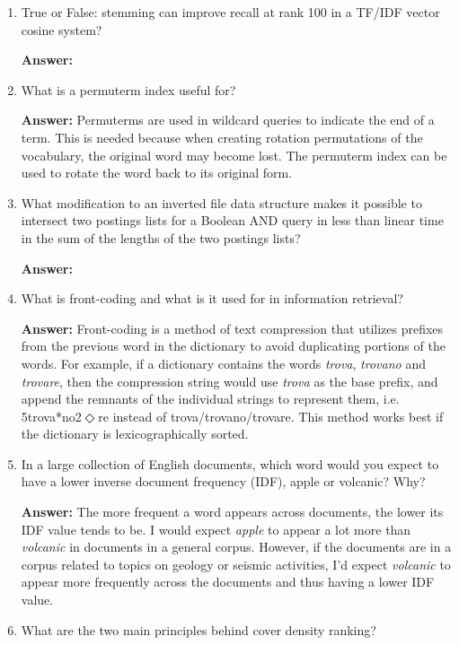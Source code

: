 \documentclass[11pt]{article}
\begin{document}
\begin{enumerate}
\begin{enumerate}
          \item True or False: stemming can improve recall at rank 100 in a TF/IDF vector cosine system?

                \textbf{Answer:}

          \item What is a permuterm index useful for?

                \textbf{Answer:} Permuterms are used in wildcard queries to indicate the end of a term. This is needed because when creating rotation permutations of the vocabulary, the original word may become lost. The permuterm index can be used to rotate the word back to its original form.

          \item What modification to an inverted file data structure makes it possible to intersect two postings lists for a Boolean AND query in less than linear time in the sum of the lengths of the two postings lists?

                \textbf{Answer:}

          \item What is front-coding and what is it used for in information retrieval?

                \textbf{Answer:} Front-coding is a method of text compression that utilizes prefixes from the previous word in the dictionary to avoid duplicating portions of the words. For example, if a dictionary contains the words \textit{trova}, \textit{trovano} and \textit{trovare}, then the compression string would use \textit{trova} as the base prefix, and append the remnants of the individual strings to represent them, i.e. 5trova*no2$\Diamond$re instead of trova/trovano/trovare. This method works best if the dictionary is lexicographically sorted.

          \item In a large collection of English documents, which word would you expect to have a lower inverse document frequency (IDF), apple or volcanic? Why?

                \textbf{Answer:} The more frequent a word appears across documents, the lower its IDF value tends to be. I would expect \textit{apple} to appear a lot more than \textit{volcanic} in documents in a general corpus. However, if the documents are in a corpus related to topics on geology or seismic activities, I'd expect \textit{volcanic} to appear more frequently across the documents and thus having a lower IDF value.

          \item What are the two main principles behind cover density ranking?


\end{enumerate}
\end{enumerate}
\end{document}
